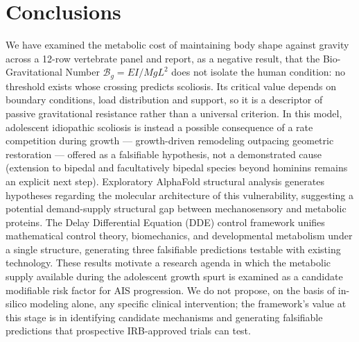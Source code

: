 \section{Conclusions}

We have examined the metabolic cost of maintaining body shape against gravity across a 12-row vertebrate panel and report, as a negative result, that the Bio-Gravitational Number $\mathcal{B}_g = EI/MgL^2$ does not isolate the human condition: no threshold exists whose crossing predicts scoliosis. Its critical value depends on boundary conditions, load distribution and support, so it is a descriptor of passive gravitational resistance rather than a universal criterion. In this model, adolescent idiopathic scoliosis is instead a possible consequence of a rate competition during growth --- growth-driven remodeling outpacing geometric restoration --- offered as a falsifiable hypothesis, not a demonstrated cause (extension to bipedal and facultatively bipedal species beyond hominins remains an explicit next step). Exploratory AlphaFold structural analysis generates hypotheses regarding the molecular architecture of this vulnerability, suggesting a potential demand-supply structural gap between mechanosensory and metabolic proteins. The Delay Differential Equation (DDE) control framework unifies mathematical control theory, biomechanics, and developmental metabolism under a single structure, generating three falsifiable predictions testable with existing technology. These results motivate a research agenda in which the metabolic supply available during the adolescent growth spurt is examined as a candidate modifiable risk factor for AIS progression. We do not propose, on the basis of in-silico modeling alone, any specific clinical intervention; the framework's value at this stage is in identifying candidate mechanisms and generating falsifiable predictions that prospective IRB-approved trials can test.
